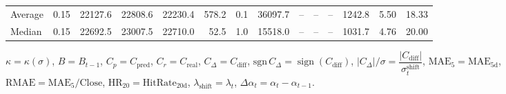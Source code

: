 \begin{threeparttable}
{\begin{tabular}{lrrrrrrrrrrrrr}
Average &     0.15 & 22127.6 & 22808.6 & 22230.4 &      578.2 &                      0.1 &             36097.7 &         -- &        -- &             -- &           1242.8 &            5.50 &                  18.33 \\
 Median &     0.15 & 22692.5 & 23007.5 & 22710.0 &       52.5 &                      1.0 &             15518.0 &         -- &        -- &             -- &           1031.7 &            4.76 &                  20.00 \\
\bottomrule
\end{tabular}
}
\begin{tablenotes}\footnotesize
\item $\kappa=\kappa(\sigma)$, $B=B_{t-1}$, $C_p=C_{\text{pred}}$, $C_r=C_{\text{real}}$, $C_\Delta=C_{\text{diff}}$, $\mathrm{sgn}\,C_\Delta=\operatorname{sign}(C_{\text{diff}})$, $|C_\Delta|/\sigma=\dfrac{|C_{\text{diff}}|}{\sigma_t^{\text{shift}}}$, $\mathrm{MAE}_5=\mathrm{MAE}_{5\text{d}}$, $\mathrm{RMAE}= \mathrm{MAE}_5 / \text{Close}$, $\mathrm{HR}_{20}=\mathrm{HitRate}_{20\text{d}}$, 
$\lambda_{\text{shift}}=\lambda_t$, 
$\Delta\alpha_t=\alpha_t-\alpha_{t-1}$.
\end{tablenotes}
\end{threeparttable}
\endgroup
